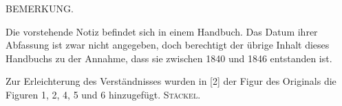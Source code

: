 %
\begin{center}
BEMERKUNG.
\end{center}

Die vorstehende Notiz befindet sich in einem Handbuch. Das Datum ihrer Abfassung ist zwar nicht angegeben, doch berechtigt der übrige Inhalt dieses Handbuchs zu der Annahme, dass sie zwischen 1840 und 1846 entstanden ist.

Zur Erleichterung des Verständnisses wurden in [2] der Figur des Originals die Figuren 1, 2, 4, 5 und 6 hinzugefügt. \hfill\textsc{Stäckel}.
